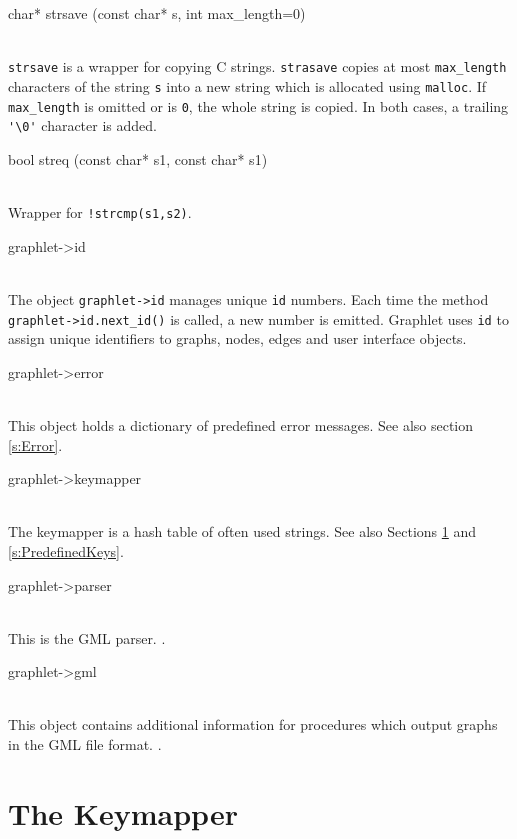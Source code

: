 \documentclass[twoside,fleqn]{report}
\begin{document}
\begin{Cdefinition}

  \item[char* strsave (const char* s, int max\_length=0)] \strut\\
  \texttt{strsave} is a wrapper for copying C strings.
  \texttt{strasave} copies at most \texttt{max\_length}
  characters of the string \texttt{s} into a new string which is
  allocated using \texttt{malloc}. If \texttt{max\_length} is
  omitted or is \texttt{0}, the whole string is copied. In both
  cases, a trailing \verb|'\0'| character is added.

  \item[bool streq (const char* s1, const char* s1)] \strut\\
  Wrapper for \texttt{!strcmp(s1,s2)}.

  \item[graphlet->id]  \strut\\
  The object \texttt{graphlet->id} manages unique \texttt{id} numbers.
  Each time the method \texttt{graphlet->id.next\_id()} is called, a
  new number is emitted.  Graphlet uses \texttt{id} to assign
  unique identifiers to graphs, nodes, edges and user interface
  objects.
  
  \item[graphlet->error]  \strut\\
  This object holds a dictionary of predefined error messages.
  See also section \ref{s:Error}.

  \item[graphlet->keymapper] \strut\\
  The keymapper is a hash table of often used strings. See also
  Sections \ref{s:Keymapper} and \ref{s:PredefinedKeys}.

  \item[graphlet->parser] \strut\\
  This is the GML parser. \NYD.
  
  \item[graphlet->gml] \strut\\
  This object contains additional information for procedures
  which output graphs in the GML file format.  \NYD.

\end{Cdefinition}



%
%

\section{The Keymapper}
\label{s:Keymapper}
\end{document}
